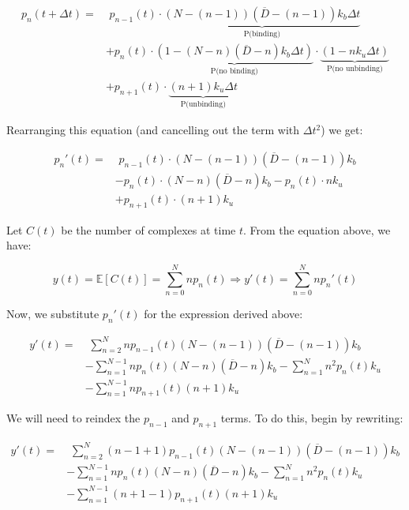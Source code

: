 \documentclass{article}
\begin{document}
\begin{flushleft}
$$
\begin{aligned}
  p_{n}(t + \Delta t)= &\,\,p_{n-1}(t) \cdot \underbrace{(N - (n - 1))(\overline{D} - (n - 1)) k_{b} \Delta t}_{\text{P(binding)}}  \\[5pt]
                      &+ p_{n}(t) \cdot \underbrace{(1 - (N - n)(\overline{D} - n)k_{b}\Delta t)}_{\text{P(no binding)}} \cdot \underbrace{(1 - n k_{u} \Delta t)}_{\text{P(no unbinding)}} \\[5pt]
                      &+ p_{n+1}(t) \cdot \underbrace{(n + 1)k_{u}\Delta t}_{\text{P(unbinding)}}
\end{aligned}
$$

Rearranging this equation (and cancelling out the term with $\Delta t^2$) we get: 

$$
\begin{aligned}
p_{n}'(t) = &\,\,p_{n-1}(t) \cdot (N - (n - 1))(\overline{D} - (n - 1)) k_{b} \\[5pt]
            &-p_{n}(t)\cdot (N-n)(\overline{D} - n)k_{b} - p_{n}(t) \cdot n k_{u} \\[5pt]
            &+ p_{n+1}(t) \cdot (n + 1)k_{u}
\end{aligned}
$$

Let $C(t)$ be the number of complexes at time $t$. From the equation above, we have:

$$
y(t) = \mathbb{E}[C(t)] = \sum_{n = 0}^{N} np_{n}(t) \Rightarrow y'(t) = \sum_{n = 0}^{N} np_{n}'(t)
$$

Now, we substitute $p_{n}'(t)$ for the expression derived above:

$$
\begin{aligned}
  y'(t) = &\,\,\sum_{n = 2}^{N}  np_{n-1}(t)(N - (n - 1))(\overline{D} - (n - 1)) k_{b} \\[5pt]
          &-  \sum_{n = 1}^{N - 1} np_{n}(t) (N - n)(\overline{D} - n )k_{b} -  \sum_{n = 1}^{N}  n^2 p_{n}(t) k_{u} \\[5pt]
          &- \sum_{n = 1}^{N - 1}  np_{n+1}(t) (n+1)k_{u}
\end{aligned}
$$

We will need to reindex the $p_{n-1}$ and $p_{n+1}$ terms. To do this, begin by rewriting:

$$
\begin{aligned}
  y'(t) = &\,\,\sum_{n = 2}^{N}  (n-1 + 1)p_{n-1}(t)(N - (n - 1))(\overline{D} - (n - 1)) k_{b} \\[5pt] 
          &-  \sum_{n = 1}^{N - 1} np_{n}(t) (N - n)( \overline{D} - n)k_{b} -  \sum_{n = 1}^{N}  n^2 p_{n}(t) k_{u} \\[5pt]
          &- \sum_{n = 1}^{N - 1}  (n + 1 - 1)p_{n+1}(t) (n+1)k_{u}
\end{aligned}
$$


\end{flushleft}
\end{document}
